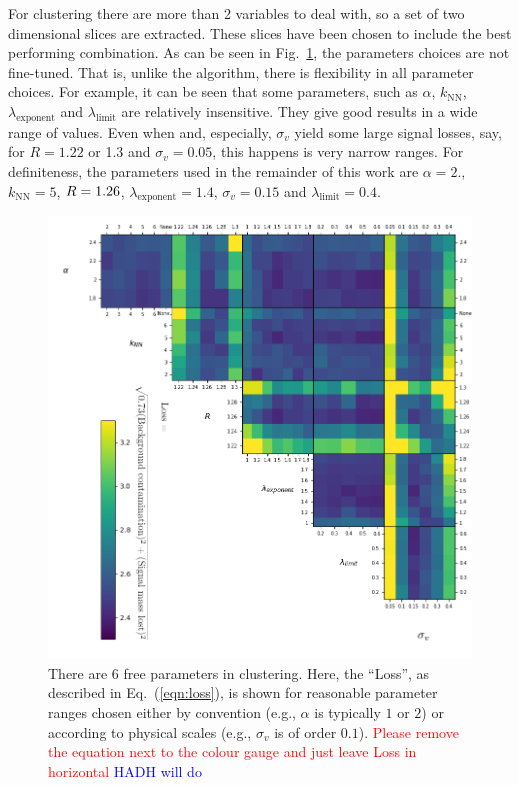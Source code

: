 For \spectral{} clustering there are more than 2 variables to deal with, 
so a set of two dimensional slices are extracted. 
These slices have been chosen to include the best performing combination.
%
    As can be seen in Fig.~\ref{fig:scan_spectral}, the parameters choices  are not fine-tuned. That is, 
    unlike the \antikt{} algorithm, there is flexibility in all parameter choices. For example, it can be seen that some parameters, such as \(\alpha\), \(k_\text{NN}\), \(\lambda_\text{exponent}\)
                and \(\lambda_\text{limit}\) are relatively insensitive.
                They give good results in a wide range of values.
                Even when \stoppingdeltar{} and, especially, \(\sigma_v\) yield some large signal losses, say, for $R=1.22$ or 1.3 and $\sigma_v=0.05$, this happens is very narrow ranges.  For definiteness, the
    parameters used in the remainder of this work are \(\alpha=2.\), \(k_\text{NN}=5\), \(R{} = 1.26\), \(\lambda_\text{exponent} = 1.4\), \(\sigma_v = 0.15\) and \(\lambda_\text{limit} = 0.4\).
\clearpage
    \begin{figure}[!t]
            \includegraphics[width=1\textwidth]{graphics/trangle_scan_incomplete2.png}
            \caption{There are 6 free parameters in \spectral{} clustering.
                Here, the ``Loss'', as described in Eq.~(\ref{eqn:loss}), is shown for reasonable  parameter ranges chosen
                either by convention (e.g., \(\alpha\) is typically \(1\) or \(2\))
                or according to physical scales (e.g., $\sigma_v$ is of order \(0.1\)).
                {\textcolor{red}{Please remove the equation next to the colour gauge and just leave Loss in horizontal}
                \textcolor{blue}{HADH will do}}
             }\label{fig:scan_spectral}
    \end{figure}    


